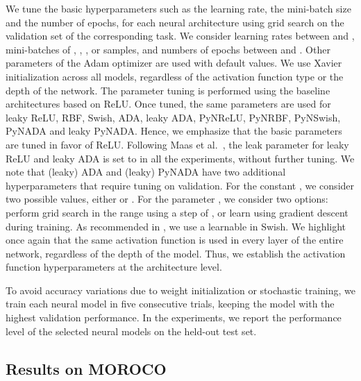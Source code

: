 \documentclass[pdflatex,sn-mathphys]{sn-jnl}
\theoremstyle{thmstyleone}
\theoremstyle{thmstyletwo}\newtheorem{example}{Example}\newtheorem{remark}{Remark}
\theoremstyle{thmstylethree}\newtheorem{definition}{Definition}\DeclareMathOperator{\sinc}{sinc}
\begin{document}
We tune the basic hyperparameters such as the learning rate, the mini-batch size and the number of epochs, for each neural architecture using grid search on the validation set of the corresponding task. We consider learning rates between  and , mini-batches of , , ,  or  samples, and numbers of epochs between  and . Other parameters of the Adam optimizer are used with default values. We use Xavier initialization across all models, regardless of the activation function type or the depth of the network. The parameter tuning is performed using the baseline architectures based on ReLU. Once tuned, the same parameters are used for leaky ReLU, RBF, Swish, ADA, leaky ADA, PyNReLU, PyNRBF, PyNSwish, PyNADA and leaky PyNADA. Hence, we emphasize that the basic parameters are tuned in favor of ReLU. Following Maas et al.~\cite{Maas-WDLASL-2013}, the leak parameter for leaky ReLU and leaky ADA is set to  in all the experiments, without further tuning.
We note that (leaky) ADA and (leaky) PyNADA have two additional hyperparameters that require tuning on validation. For the constant , we consider two possible values, either  or . For the parameter , we consider two options:  perform grid search in the range  using a step of , or  learn  using gradient descent during training. As recommended in \citep{Ramachandran-ICLRW-2018}, we use a learnable  in Swish. We highlight once again that the same activation function is used in every layer of the entire network, regardless of the depth of the model. Thus, we establish the activation function hyperparameters at the architecture level.

To avoid accuracy variations due to weight initialization or stochastic training, we train each neural model in five consecutive trials, keeping the model with the highest validation performance. In the experiments, we report the performance level of the selected neural models on the held-out test set.

\subsection{Results on MOROCO}
\label{sec_results_moroco}
\end{document}
